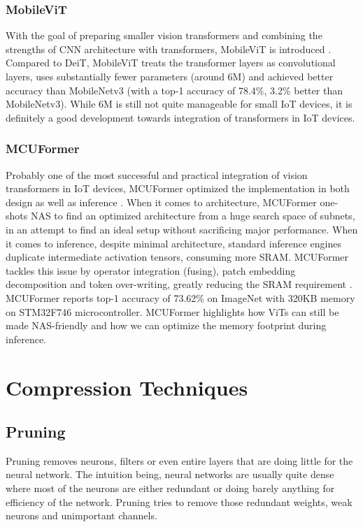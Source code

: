 \documentclass[conference]{IEEEtran}
\begin{document}
	\subsubsection{MobileViT}
	With the goal of preparing smaller vision transformers and combining the strengths of CNN architecture with transformers, MobileViT is introduced \cite{mobilevit2022}. Compared to DeiT, MobileViT treats the transformer layers as convolutional layers, uses substantially fewer parameters (around 6M) and achieved better accuracy than MobileNetv3 (with a top-1 accuracy of 78.4\%, 3.2\% better than MobileNetv3). While 6M is still not quite manageable for small IoT devices, it is definitely a good development towards integration of transformers in IoT devices.
	
	\subsubsection{MCUFormer}
	Probably one of the most successful and practical integration of vision transformers in IoT devices, MCUFormer optimized the implementation in both design as well as inference \cite{mcuformer2023}. When it comes to architecture, MCUFormer one-shots NAS to find an optimized architecture from a huge search space of subnets, in an attempt to find an ideal setup without sacrificing major performance. When it comes to inference, despite minimal architecture, standard inference engines duplicate intermediate activation tensors, consuming more SRAM. MCUFormer tackles this issue by operator integration (fusing), patch embedding decomposition and token over-writing, greatly reducing the SRAM requirement \cite{mcuformer2023}. MCUFormer reports top-1 accuracy of 73.62\% on ImageNet with 320KB memory on STM32F746 microcontroller. MCUFormer highlights how ViTs can still be made NAS-friendly and how we can optimize the memory footprint during inference.
	
	\section{Compression Techniques}
	
	\subsection{Pruning}
	Pruning removes neurons, filters or even entire layers that are doing little for the neural network. The intuition being, neural networks are usually quite dense where most of the neurons are either redundant or doing barely anything for efficiency of the network. Pruning tries to remove those redundant weights, weak neurons and unimportant channels.
	
\end{document}

